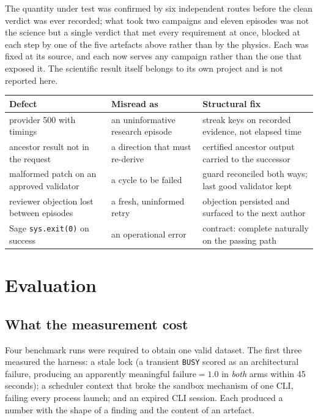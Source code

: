 \documentclass[11pt,a4paper]{article}
\newcommand{\code}[1]{\texttt{\small #1}}
\begin{document}
\smallskip
\noindent
The quantity under test was confirmed by six independent routes before the clean
verdict was ever recorded; what took two campaigns and eleven episodes was not the
science but a single verdict that met every requirement at once, blocked at each
step by one of the five artefacts above rather than by the physics. Each was fixed
at its source, and each now serves any campaign rather than the one that exposed
it. The scientific result itself belongs to its own project and is not reported
here.

\begin{center}
\small
\begin{tabular}{@{}p{4.7cm}p{4.6cm}p{4.7cm}@{}}
\toprule
\textbf{Defect} & \textbf{Misread as} & \textbf{Structural fix} \\
\midrule
provider 500 with timings & an uninformative research episode &
streak keys on recorded evidence, not elapsed time \\
ancestor result not in the request & a direction that must re-derive &
certified ancestor output carried to the successor \\
malformed patch on an approved validator & a cycle to be failed &
guard reconciled both ways; last good validator kept \\
reviewer objection lost between episodes & a fresh, uninformed retry &
objection persisted and surfaced to the next author \\
Sage \code{sys.exit(0)} on success & an operational error &
contract: complete naturally on the passing path \\
\bottomrule
\end{tabular}
\end{center}

\section{Evaluation}
\label{sec:eval}

\subsection{What the measurement cost}

Four benchmark runs were required to obtain one valid dataset. The first three
measured the harness: a stale lock (a transient \code{BUSY} scored as an
architectural failure, producing an apparently meaningful
$\textrm{failure}=1.0$ in \emph{both} arms within 45 seconds); a scheduler
context that broke the sandbox mechanism of one CLI, failing every process
launch; and an expired CLI session. Each produced a number with the shape of a
finding and the content of an artefact.
\end{document}
